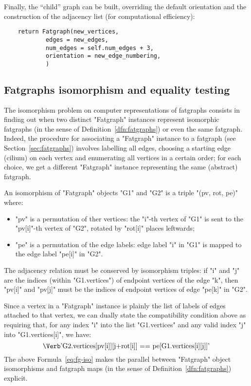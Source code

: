 Finally, the ``child'' graph can be built, overriding the default
orientation and the construction of the adjacency list (for
computational efficiency):
\begin{lstlisting}
    return Fatgraph(new_vertices,
            edges = new_edges,
            num_edges = self.num_edges + 3,
            orientation = new_edge_numbering,
            )
\end{lstlisting}


\subsection{Fatgraphs isomorphism and equality testing}
\label{sec:isomorphism}

The isomorphism problem on computer representations of fatgraphs
consists in finding out when two distinct "Fatgraph" instances
represent isomorphic fatgraphs (in the sense of
Definition~\ref{dfn:fatgraphs}) or even the same fatgraph.  Indeed,
the procedure for associating a "Fatgraph" instance to a fatgraph (see
Section~\ref{sec:fatgraphs}) involves labelling all edges, choosing a
starting edge (cilium) on each vertex and enumerating all vertices in
a certain order; for each choice, we get a different "Fatgraph"
instance representing the same (abstract) fatgraph.

\begin{definition}
  An isomorphism of "Fatgraph" objects "G1" and "G2" is a triple 
  "(pv, rot, pe)" where:
  \begin{itemize}
  \item "pv" is a permutation of ther vertices: the "i"-th vertex of
    "G1" is sent to the "pv[i]"-th vertex of "G2", rotated by "rot[i]"
    places leftwards;
  \item "pe" is a permutation of the edge labels: edge label "i" in
    "G1" is mapped to the edge label "pe[i]" in "G2".
  \end{itemize}
  The adjacency relation must be conserved by isomorphism triples: if
  "i" and "j" are the indices (within "G1.vertices") of endpoint
  vertices of the edge "k", then "pv[i]" and "pv[j]" must be the
  indices of endpoint vertices of edge "pe[k]" in "G2".
\end{definition}
Since a vertex in a "Fatgraph" instance is plainly the list of labels
of edges attached to that vertex, we can dually state the
compatibility condition above as requiring that, for any index "i"
into the list "G1.vertices" and any valid index "j" into
"G1.vertices[i]", we have:
\begin{equation}
  \label{eq:fg-iso}
  \text{\protect\Verb'G2.vertices[pv[i]][j+rot[i]] == pe[G1.vertices[i][j]]'}
\end{equation}
The above Formula~\eqref{eq:fg-iso} makes the parallel between "Fatgraph" object
isomorphisms and fatgraph maps (in the sense of
Definition~\ref{dfn:fatgraphs}) explicit.

